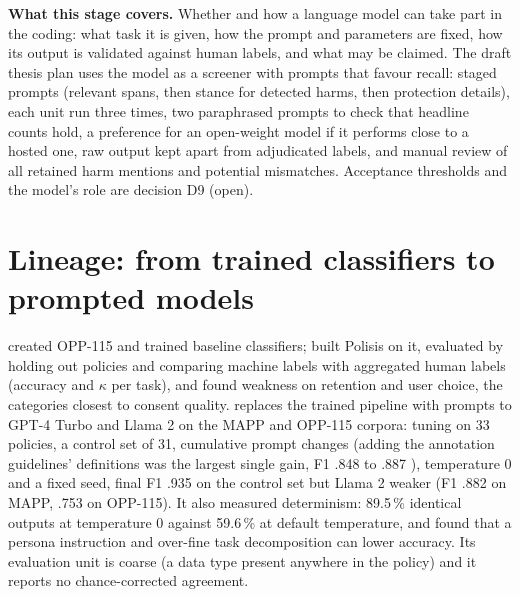 
\noindent\textbf{What this stage covers.} Whether and how a language model can take part in the coding: what task it is given, how the prompt and parameters are fixed, how its output is validated against human labels, and what may be claimed. The draft thesis plan uses the model as a screener with prompts that favour recall: staged prompts (relevant spans, then stance for detected harms, then protection details), each unit run three times, two paraphrased prompts to check that headline counts hold, a preference for an open-weight model if it performs close to a hosted one, raw output kept apart from adjudicated labels, and manual review of all retained harm mentions and potential mismatches. Acceptance thresholds and the model's role are decision D9 (open).

\section{Lineage: from trained classifiers to prompted models}
 created OPP-115 and trained baseline classifiers;  built Polisis on it, evaluated by holding out policies and comparing machine labels with aggregated human labels (accuracy and $\kappa$ per task), and found weakness on retention and user choice, the categories closest to consent quality.  replaces the trained pipeline with prompts to GPT-4 Turbo and Llama 2 on the MAPP and OPP-115 corpora: tuning on 33 policies, a control set of 31, cumulative prompt changes (adding the annotation guidelines' definitions was the largest single gain, F1 .848 to .887 ), temperature 0 and a fixed seed, final F1 .935 on the control set  but Llama 2 weaker (F1 .882 on MAPP, .753 on OPP-115). It also measured determinism: 89.5\,\% identical outputs at temperature 0  against 59.6\,\% at default temperature, and found that a persona instruction and over-fine task decomposition can lower accuracy. Its evaluation unit is coarse (a data type present anywhere in the policy) and it reports no chance-corrected agreement.

